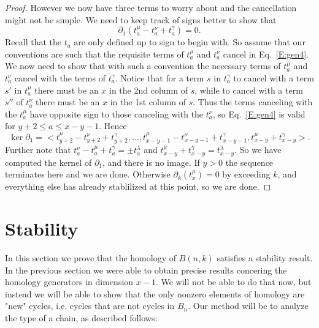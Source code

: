 \documentclass{amsart}
\begin{document}
\begin{proof}
  However we now have three terms to worry about and the cancellation might not be simple. We need to keep track of signs better to show 
  that 
  \begin{equation}\label{E:gen4}
    \partial_1(t^\mu_a -t^\nu_a + t^\gamma_a) = 0.
  \end{equation}
  Recall that the $t_a$ are only defined up to sign to begin with. So assume that our
  conventions are such that the requisite terms of $t^\mu_a$ and $t^\nu_a$ cancel in Eq.~\ref{E:gen4}. We now need to show that with 
  such a convention the necessary terms of $t^\mu_a$ and $t^\nu_a$ cancel with the terms of $t^\gamma_a$. Notice that for a term $s$ in 
  $t^\gamma_a$ to cancel with a term $s'$ in $t^\mu_a$ there must be an $x$ in the 2nd column of $s$, while to cancel with a term $s''$ of 
  $t^\nu_a$ there must be an $x$ in the 1st column of $s$. Thus the terms canceling with the $t^\mu_a$ have opposite sign to those 
  canceling with the $t^\nu_a$, so Eq.~\ref{E:gen4} is valid for $y+2 \le a \le x-y-1$. Hence $$\ker \partial_1 = < 
  t^\mu_{y+2} -t^\nu_{y+2} + t^\gamma_{y+2}, \ldots, t^\mu_{x-y-1} -t^\nu_{x-y-1} + t^\gamma_{x-y-1}, t^\mu_{x-y}+ t^\gamma_{x-y}>.$$
  Further note that $t^\nu_a-t^\mu_a+ t^\gamma_a = \pm t^\lambda_a$ and $t^\mu_{x-y}+t^\gamma_{x-y} = t^\lambda_{x-y}$.
  So we have computed the kernel of $\partial_1$, and there is no image. If $y>0$ the sequence terminates here and we are done. Otherwise
  $\partial_k(t^\mu_x)= 0$ by exceeding $k$, and everything else has already stablilized at this point, so we are done.

\end{proof}  




\section{Stability} \label{S:stability}

In this section we prove that the homology of $B(n, k)$ satisfies a stability result. In the previous section we were able
to obtain precise results concering the homology generators in dimension $x-1$. We will not be able to do that now, but 
instead we will be able to show that the only nonzero elements of homology are "new" cycles, i.e. cycles that are not 
cycles in $B_n$.  Our method will be to analyze the type of a chain, as described follows:
\end{document}
